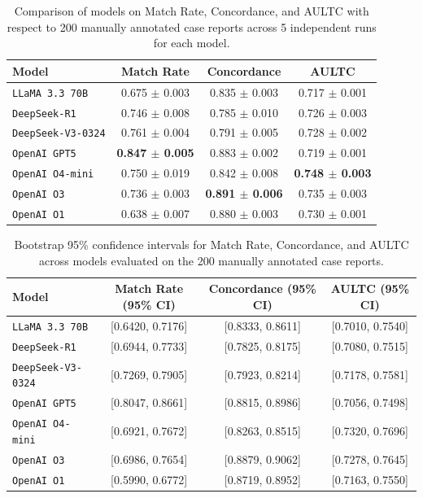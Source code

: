 \documentclass[pdflatex,sn-mathphys-num]{sn-jnl}%
\theoremstyle{thmstyleone}%
\theoremstyle{thmstyletwo}%
\theoremstyle{thmstylethree}%
\begin{document}
\begin{table}[h!]
\vspace{-5mm}
\centering
\caption{Comparison of models on Match Rate, Concordance, and AULTC with respect to 200 manually annotated case reports across 5 independent runs for each model.}
\label{tab:model_comparison}
\begin{tabular}{lccc}
\hline
\textbf{Model} & \textbf{Match Rate} & \textbf{Concordance} & \textbf{AULTC} \\
\hline
\texttt{LLaMA 3.3 70B}       & 0.675 $\pm$ 0.003 & 0.835 $\pm$ 0.003 & 0.717 $\pm$ 0.001 \\
\texttt{DeepSeek-R1}         & 0.746 $\pm$ 0.008 & 0.785 $\pm$ 0.010 & 0.726 $\pm$ 0.003 \\
\texttt{DeepSeek-V3-0324}    & 0.761 $\pm$ 0.004 & 0.791 $\pm$ 0.005 & 0.728 $\pm$ 0.002 \\
\texttt{OpenAI GPT5}         & \textbf{0.847 $\pm$ 0.005} & 0.883 $\pm$ 0.002 & 0.719 $\pm$ 0.001 \\
\texttt{OpenAI O4-mini}      & 0.750 $\pm$ 0.019 & 0.842 $\pm$ 0.008 & \textbf{0.748 $\pm$ 0.003} \\
\texttt{OpenAI O3}           & 0.736 $\pm$ 0.003 & \textbf{0.891 $\pm$ 0.006} & 0.735 $\pm$ 0.003 \\
\texttt{OpenAI O1}           & 0.638 $\pm$ 0.007 & 0.880 $\pm$ 0.003 & 0.730 $\pm$ 0.001 \\
\hline
\end{tabular}
\vspace{-7.5mm}
\end{table}

\begin{table}[ht!]
\vspace{-7.5mm}
\centering
\caption{Bootstrap 95\% confidence intervals for Match Rate, Concordance, and AULTC across models evaluated on the 200 manually annotated case reports.}
\label{tab:bootstrap_intervals}
\begin{tabular}{lccc}
\hline
\textbf{Model} & \textbf{Match Rate (95\% CI)} & \textbf{Concordance (95\% CI)} & \textbf{AULTC (95\% CI)} \\
\hline
\texttt{LLaMA 3.3 70B}      & [0.6420, 0.7176] & [0.8333, 0.8611] & [0.7010, 0.7540] \\
\texttt{DeepSeek-R1}        & [0.6944, 0.7733] & [0.7825, 0.8175] & [0.7080, 0.7515] \\
\texttt{DeepSeek-V3-0324}   & [0.7269, 0.7905] & [0.7923, 0.8214] & [0.7178, 0.7581] \\
\texttt{OpenAI GPT5}        & [0.8047, 0.8661] & [0.8815, 0.8986] & [0.7056, 0.7498] \\
\texttt{OpenAI O4-mini}     & [0.6921, 0.7672] & [0.8263, 0.8515] & [0.7320, 0.7696] \\
\texttt{OpenAI O3}          & [0.6986, 0.7654] & [0.8879, 0.9062] & [0.7278, 0.7645] \\
\texttt{OpenAI O1}          & [0.5990, 0.6772] & [0.8719, 0.8952] & [0.7163, 0.7550] \\
\hline
\end{tabular}
\vspace{-7.5mm}
\end{table}
\end{document}
